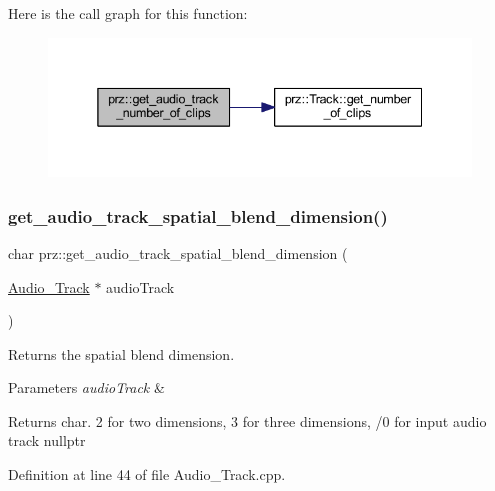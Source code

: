 Here is the call graph for this function\+:
\nopagebreak
\begin{figure}[H]
\begin{center}
\leavevmode
\includegraphics[width=338pt]{namespaceprz_a8f5ec57a63ae029d8417d533e30965f4_cgraph}
\end{center}
\end{figure}
\mbox{\label{namespaceprz_a4fb782ac49bc3d6a8d5ef62f0d529b29}} 
\subsubsection{\texorpdfstring{get\_audio\_track\_spatial\_blend\_dimension()}{get\_audio\_track\_spatial\_blend\_dimension()}}
{\footnotesize\ttfamily char prz\+::get\+\_\+audio\+\_\+track\+\_\+spatial\+\_\+blend\+\_\+dimension (\begin{DoxyParamCaption}\item[{\mbox{\hyperlink{classprz_1_1_audio___track}{Audio\+\_\+\+Track}} $\ast$}]{audio\+Track }\end{DoxyParamCaption})}



Returns the spatial blend dimension. 


\begin{DoxyParams}{Parameters}
{\em audio\+Track} & \\
\hline
\end{DoxyParams}
\begin{DoxyReturn}{Returns}
char. \textquotesingle{}2\textquotesingle{} for two dimensions, \textquotesingle{}3\textquotesingle{} for three dimensions, \textquotesingle{}/0\textquotesingle{} for input audio track nullptr 
\end{DoxyReturn}


Definition at line 44 of file Audio\+\_\+\+Track.\+cpp.

